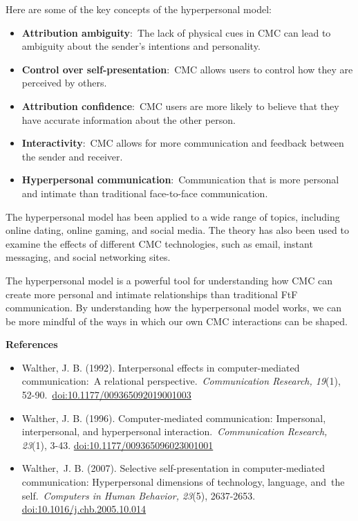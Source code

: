 \documentclass[
  b5paper]{book}
\begin{document}
Here are some of the key concepts of the hyperpersonal model:

\begin{itemize}
\item
  \textbf{Attribution ambiguity}:~The lack of physical cues in CMC can lead to ambiguity about the sender's intentions and personality.
\item
  \textbf{Control over self-presentation}:~CMC allows users to control how they are perceived by others.
\item
  \textbf{Attribution confidence}:~CMC users are more likely to believe that they have accurate information about the other person.
\item
  \textbf{Interactivity}:~CMC allows for more communication and feedback between the sender and receiver.
\item
  \textbf{Hyperpersonal communication}:~Communication that is more personal and intimate than traditional face-to-face communication.
\end{itemize}

The hyperpersonal model has been applied to a wide range of topics, including online dating, online gaming, and social media. The theory has also been used to examine the effects of different CMC technologies, such as email, instant messaging, and social networking sites.

The hyperpersonal model is a powerful tool for understanding how CMC can create more personal and intimate relationships than traditional FtF communication. By understanding how the hyperpersonal model works, we can be more mindful of the ways in which our own CMC interactions can be shaped.

\textbf{References}

\begin{itemize}
\item
  Walther, J. B. (1992). Interpersonal effects in computer-mediated communication:~A relational perspective.~\emph{Communication Research, 19}(1), 52-90.~\url{doi:10.1177/009365092019001003}
\item
  Walther, J. B. (1996). Computer-mediated communication: Impersonal, interpersonal, and hyperpersonal interaction.~\emph{Communication Research, 23}(1), 3-43. \url{doi:10.1177/009365096023001001}
\item
  Walther,~J. B. (2007). Selective self-presentation in computer-mediated communication: Hyperpersonal dimensions of technology, language, and~the self.~\emph{Computers in Human Behavior, 23}(5), 2637-2653. \url{doi:10.1016/j.chb.2005.10.014}
\end{itemize}
\end{document}
